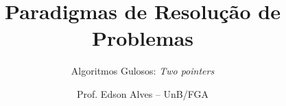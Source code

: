\title{Paradigmas de Resolução de Problemas}
\subtitle{Algoritmos Gulosos: {\it Two pointers}}
\author{Prof. Edson Alves -- UnB/FGA}
\date{}
